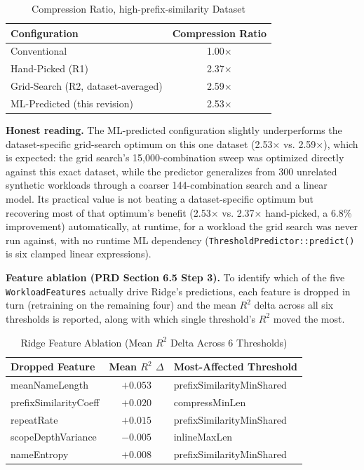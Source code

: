 \documentclass[conference]{IEEEtran}
\begin{document}
\begin{table}[htbp]
\caption{Compression Ratio, high-prefix-similarity Dataset}
\label{tab:mlcompare}
\centering
\begin{tabular}{lc}
\toprule
Configuration & Compression Ratio \\
\midrule
Conventional & 1.00$\times$ \\
Hand-Picked (R1) & 2.37$\times$ \\
Grid-Search (R2, dataset-averaged) & 2.59$\times$ \\
ML-Predicted (this revision) & 2.53$\times$ \\
\bottomrule
\end{tabular}
\end{table}

\textbf{Honest reading.} The ML-predicted configuration slightly
underperforms the dataset-specific grid-search optimum on this one dataset
(2.53$\times$ vs. 2.59$\times$), which is expected: the grid search's
15,000-combination sweep was optimized directly against this exact dataset,
while the predictor generalizes from 300 unrelated synthetic workloads
through a coarser 144-combination search and a linear model. Its practical
value is not beating a dataset-specific optimum but recovering most of that
optimum's benefit (2.53$\times$ vs. 2.37$\times$ hand-picked, a 6.8\%
improvement) automatically, at runtime, for a workload the grid search was
never run against, with no runtime ML dependency (\texttt{ThresholdPredictor::predict()}
is six clamped linear expressions).

\textbf{Feature ablation (PRD Section 6.5 Step 3).} To identify which of the
five \texttt{WorkloadFeatures} actually drive Ridge's predictions, each
feature is dropped in turn (retraining on the remaining four) and the mean
$R^2$ delta across all six thresholds is reported, along with which single
threshold's $R^2$ moved the most.

\begin{table}[htbp]
\caption{Ridge Feature Ablation (Mean $R^2$ Delta Across 6 Thresholds)}
\label{tab:featureablation}
\centering
\begin{tabular}{lcl}
\toprule
Dropped Feature & Mean $R^2$ $\Delta$ & Most-Affected Threshold \\
\midrule
meanNameLength & $+0.053$ & prefixSimilarityMinShared \\
prefixSimilarityCoeff & $+0.020$ & compressMinLen \\
repeatRate & $+0.015$ & prefixSimilarityMinShared \\
scopeDepthVariance & $-0.005$ & inlineMaxLen \\
nameEntropy & $+0.008$ & prefixSimilarityMinShared \\
\bottomrule
\end{tabular}
\end{table}
\end{document}
